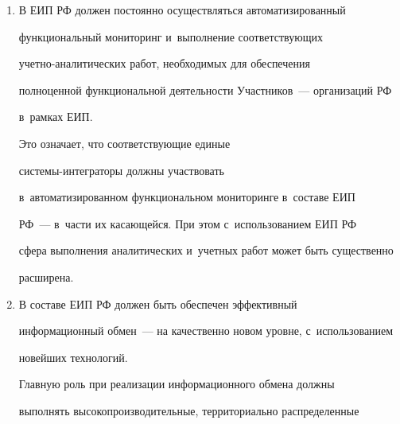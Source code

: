 \begin{enumerate}[1.]
\begin{itemize}
\item максимально возможного сокращения совокупной стоимости владения

единой системой;

\item сравнительно быстрого, полного и~относительно безболезненного

перехода от имеющего место существующей <<лоскутности>>

информатизации в~структурах РФ при множественности АИС к~рационально

отструктурированной единой сис\-те\-ме-инте\-гра\-тору;

\item эффективного доступа Участника в ЕИП РФ посредством своей

ЕИС-ин\-тегратора.

\end{itemize}

     \item  В ЕИП РФ должен постоянно осуществляться автоматизированный

функциональный мониторинг и~выполнение соответствующих

     учет\-но-ана\-ли\-ти\-че\-ских работ, необходимых для обеспечения

полноценной функциональной деятельности Участников~--- организаций РФ

в~рамках ЕИП.



     Это означает, что соответствующие единые

     сис\-те\-мы-ин\-те\-гра\-то\-ры должны участвовать

в~автоматизированном функциональном мониторинге в~со\-ста\-ве ЕИП

     РФ~--- в~час\-ти их касающейся. При этом с~использованием ЕИП РФ

сфера выполнения аналитических и~учетных работ может быть существенно

расширена.

     \item В составе ЕИП РФ должен быть обеспечен эффективный

информационный обмен~--- на качественно новом уровне, с~использованием

новейших технологий.



     Главную роль при реализации информационного обмена должны

выполнять высокопроизводительные, территориально распределенные


\end{enumerate}
